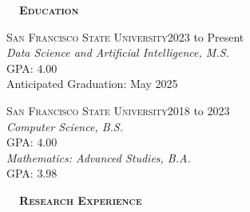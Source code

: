 \documentclass[hidelinks, 10.5pt]{article}
\def\contentwidth{0.9\linewidth}    %
\def\contentblockspacing{2.5mm}     %
\def\sectionspacing{8mm}            %
\def\sectiontocontentspacing{4mm}   %
\renewcommand{\section}[1]{
    {\fontsize{14}{14}\selectfont \textsc{\textbf{\ \ #1\ \ }}}\hrulefill
}
\begin{document}
{\centering
\vspace{\contentblockspacing}

\section{Education}

\vspace{\sectiontocontentspacing}

\begin{minipage}[ct]{0.9\linewidth}
    {\textsc{San Francisco State University}}\hfill 2023 to Present\\
    \emph{Data Science and Artificial Intelligence, M.S.}\\
    GPA: $4.00$\\
    Anticipated Graduation: May 2025
\end{minipage}

\vspace{\contentblockspacing}

\begin{minipage}[ct]{\contentwidth}
    {\textsc{San Francisco State University}}\hfill 2018 to 2023\\
    \emph{Computer Science, B.S.}\\
    GPA: $4.00$\\
    \emph{Mathematics: Advanced Studies, B.A.}\\
    GPA: $3.98$
\end{minipage}



\vspace{\sectionspacing}
{\centering


    \section{Research Experience}

    \vspace{\sectiontocontentspacing}

}}
\end{document}

